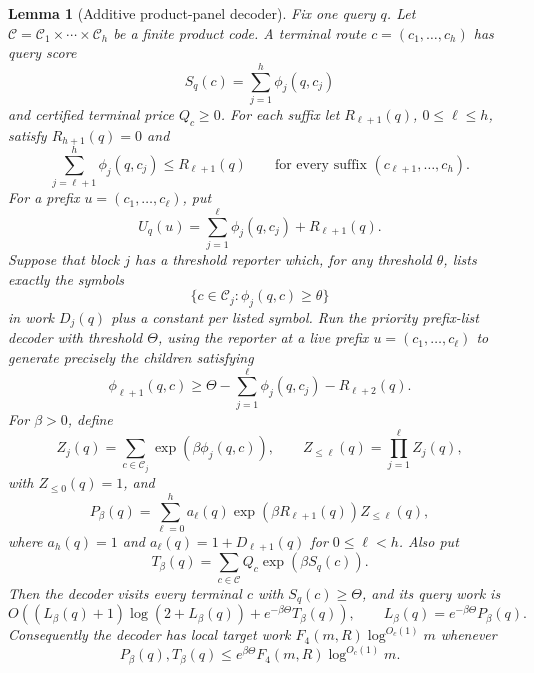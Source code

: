 \documentclass[10pt]{article}
\newtheorem{lemma}[theorem]{Lemma}
\theoremstyle{definition}
\begin{document}
\begin{lemma}[Additive product-panel decoder]
   \label{lem:additive-product-panel-decoder}
   Fix one query \(q\).  Let
   \(\mathcal C=\mathcal C_1\times\cdots\times\mathcal C_h\) be a finite
   product code.  A terminal route \(c=(c_1,\ldots,c_h)\) has query score
   \[
      S_q(c)=\sum_{j=1}^h\phi_j(q,c_j)
   \]
   and certified terminal price \(Q_c\ge0\).  For each suffix let
   \(R_{\ell+1}(q)\), \(0\le\ell\le h\), satisfy \(R_{h+1}(q)=0\) and
   \[
      \sum_{j=\ell+1}^h\phi_j(q,c_j)\le R_{\ell+1}(q)
      \qquad
      \text{for every suffix }(c_{\ell+1},\ldots,c_h).
   \]
   For a prefix \(u=(c_1,\ldots,c_\ell)\), put
   \[
      U_q(u)=\sum_{j=1}^{\ell}\phi_j(q,c_j)+R_{\ell+1}(q).
   \]
   Suppose that block \(j\) has a threshold reporter which, for any threshold
   \(\theta\), lists exactly the symbols
   \[
      \{c\in\mathcal C_j:\phi_j(q,c)\ge\theta\}
   \]
   in work \(D_j(q)\) plus a constant per listed symbol.  Run the priority
   prefix-list decoder with threshold \(\Theta\), using the reporter at a live
   prefix \(u=(c_1,\ldots,c_\ell)\) to generate precisely the children
   satisfying
   \[
      \phi_{\ell+1}(q,c)\ge
      \Theta-\sum_{j=1}^{\ell}\phi_j(q,c_j)-R_{\ell+2}(q).
   \]
   For \(\beta>0\), define
   \[
      Z_j(q)=\sum_{c\in\mathcal C_j}\exp(\beta\phi_j(q,c)),
      \qquad
      Z_{\le\ell}(q)=\prod_{j=1}^{\ell}Z_j(q),
   \]
   with \(Z_{\le0}(q)=1\), and
   \[
      P_\beta(q)=
      \sum_{\ell=0}^{h}
      a_\ell(q)\exp(\beta R_{\ell+1}(q))Z_{\le\ell}(q),
   \]
   where \(a_h(q)=1\) and
   \(a_\ell(q)=1+D_{\ell+1}(q)\) for \(0\le\ell<h\).  Also put
   \[
      T_\beta(q)=
      \sum_{c\in\mathcal C}Q_c\exp(\beta S_q(c)).
   \]
   Then the decoder visits every terminal \(c\) with \(S_q(c)\ge\Theta\), and
   its query work is
   \[
      O\!\left(
         (L_\beta(q)+1)\log(2+L_\beta(q))
         +e^{-\beta\Theta}T_\beta(q)
      \right),
      \qquad
      L_\beta(q)=e^{-\beta\Theta}P_\beta(q).
   \]
   Consequently the decoder has local target work
   \(F_4(m,R)\log^{O_c(1)}m\) whenever
   \[
      P_\beta(q),T_\beta(q)
      \le
      e^{\beta\Theta}F_4(m,R)\log^{O_c(1)}m .
   \]
\end{lemma}
\end{document}
